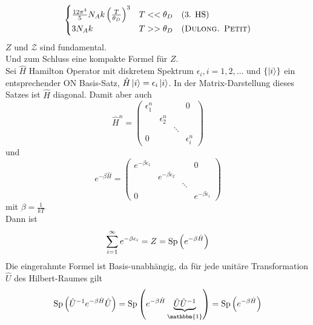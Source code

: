 \begin{enumerate}[A)]
\begin{equation}
\begin{split}
\begin{cases}
                \frac{12 \pi^4}{5} N_A k \left( \frac{T}{\theta_D} \right)^3 & T << \theta_D \quad \text{(3. HS)} \\
                3 N_A k & T >> \theta_D \quad \text{(\textsc{Dulong. Petit})}
            \end{cases}
        \end{split}
    \end{equation}
    $Z$ und $\mathcal{Z}$ sind fundamental. \\
    Und zum Schluss eine kompakte Formel für $Z$. \\
    Sei $\hat{H}$ Hamilton Operator mit diskretem Spektrum $\epsilon_i, i=1, 2, \ldots$ und $\{\left|i\right\rangle\}$ ein entsprechender ON Basis-Satz,
    $\hat{H}\left|i\right\rangle = \epsilon_i \left|i\right\rangle$. In der Matrix-Darstellung dieses Satzes ist $\hat{H}$ diagonal. Damit aber auch
    \begin{equation}
        \hat{H}^n =
        \begin{pmatrix}
            \epsilon_1^n & &  & 0 \\
             & \epsilon_2^n & & \\
             & & \ddots & \\
             0 & & & \epsilon_i^n
        \end{pmatrix}
    \end{equation}
    und
    \begin{equation}
        e^{- \beta \hat{H}} = 
        \begin{pmatrix}
            e^{- \beta \epsilon_1} & &  & 0 \\
             & e^{- \beta \epsilon_2} & & \\
             & & \ddots & \\
             0 & & & e^{- \beta \epsilon_i}
        \end{pmatrix}
    \end{equation}
    mit $\beta = \frac{1}{k T}$\\
    Dann ist
    \begin{equation}
        \sum_{i=1}^{\infty} e^{- \beta \epsilon_i} = Z = \operatorname{Sp} \left( e^{- \beta \hat{H}} \right)
    \end{equation}
    Die eingerahmte Formel ist Basis-unabhängig, da für jede unitäre Transformation $\hat{U}$ des Hilbert-Raumes gilt
    \begin{equation}
    \Sp \left( \hat{U}^{-1} e^{-\beta \hat{H}} \hat{U} \right) = \Sp \left( e^{-\beta \hat{H}} \underbrace{\hat{U} \hat{U}^{-1}}_{\mathbbm{1}} \right) = \Sp \left( e^{-\beta \hat{H}} \right) 
\end{equation}
\end{enumerate}